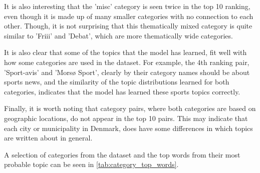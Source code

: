It is also interesting that the 'misc' category is seen twice in the top 10 ranking, even though it is made up of many smaller categories with no connection to each other.
Though, it is not surprising that this thematically mixed category is quite similar to 'Friii' and 'Debat', which are more thematically wide categories.

It is also clear that some of the topics that the model has learned, fit well with how some categories are used in the dataset.
For example, the 4th ranking pair, 'Sport-avis' and 'Morsø Sport', clearly by their category names should be about sports news, and the similarity of the topic distributions learned for both categories, indicates that the model has learned these sports topics correctly.

Finally, it is worth noting that category pairs, where both categories are based on geographic locations, do not appear in the top 10 pairs.
This may indicate that each city or municipality in Denmark, does have some differences in which topics are written about in general.

A selection of categories from the dataset and the top words from their most probable topic can be seen in \autoref{tab:category_top_words}.

